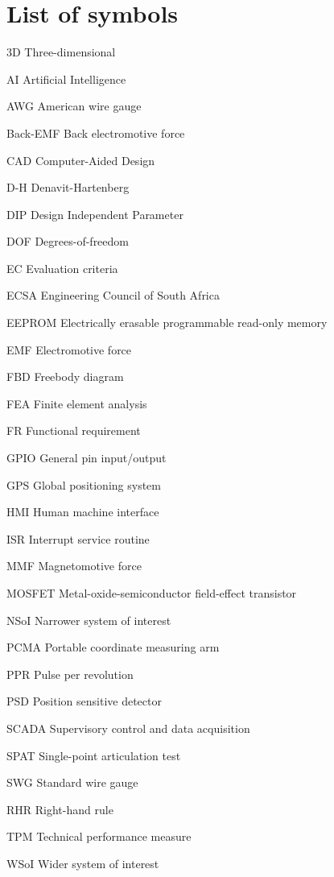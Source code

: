 \chapter{List of symbols}

\begin{Nomencl}[1cm]
    \item[3D] Three-dimensional
    \item[AI] Artificial Intelligence
    \item[AWG] American wire gauge
    \item[Back-EMF] Back electromotive force
    \item[CAD] Computer-Aided Design
    \item[D-H] Denavit-Hartenberg
    \item[DIP] Design Independent Parameter
    \item[DOF] Degrees-of-freedom
    \item[EC] Evaluation criteria
    \item[ECSA] Engineering Council of South Africa
    \item[EEPROM] Electrically erasable programmable read-only memory
    \item[EMF] Electromotive force
    \item[FBD] Freebody diagram
    \item[FEA] Finite element analysis
    \item[FR] Functional requirement
    \item[GPIO] General pin input/output
    \item[GPS] Global positioning system
    \item[HMI] Human machine interface
    \item[ISR] Interrupt service routine
    \item[MMF] Magnetomotive force
    \item[MOSFET] Metal-oxide-semiconductor field-effect transistor
    \item[NSoI] Narrower system of interest
    \item[PCMA] Portable coordinate measuring arm
    \item[PPR] Pulse per revolution
    \item[PSD] Position sensitive detector
    \item[SCADA] Supervisory control and data acquisition
    \item[SPAT] Single-point articulation test
    \item[SWG] Standard wire gauge
    \item[RHR] Right-hand rule
    \item[TPM] Technical performance measure
    \item[WSoI] Wider system of interest
\end{Nomencl}
